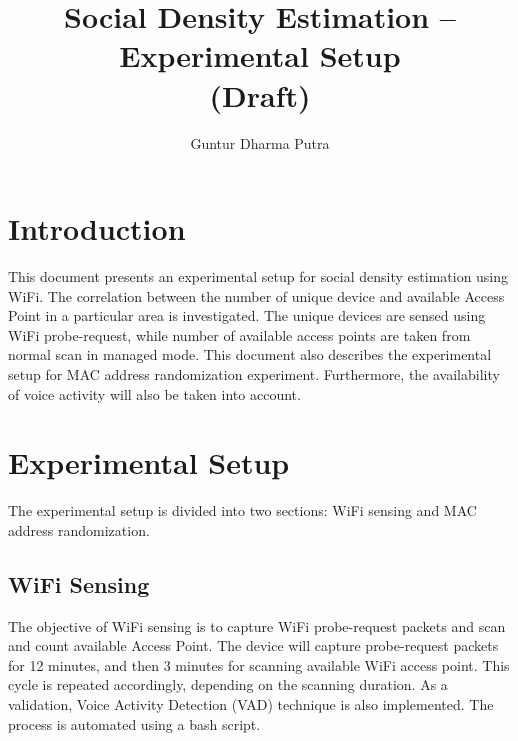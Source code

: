 \documentclass{article}
\begin{document}
\title{Social Density Estimation -- Experimental Setup\\(Draft)}
\author{Guntur Dharma Putra}

\maketitle



\section{Introduction} %
\label{sec:introduction}
This document presents an experimental setup for social density estimation using WiFi. The correlation between the number of unique device and available Access Point in a particular area is investigated. The unique devices are sensed using WiFi probe-request, while number of available access points are taken from normal scan in managed mode. This document also describes the experimental setup for MAC address randomization experiment. Furthermore, the availability of voice activity will also be taken into account.

\section{Experimental Setup} %
\label{sec:experimental_setup}
The experimental setup is divided into two sections: WiFi sensing and MAC address randomization.

\subsection{WiFi Sensing} %
\label{sub:wifi_sensing}
The objective of WiFi sensing is to capture WiFi probe-request packets and scan and count available Access Point. The device will capture probe-request packets for 12 minutes, and then 3 minutes for scanning available WiFi access point. This cycle is repeated accordingly, depending on the scanning duration. As a validation, Voice Activity Detection (VAD) technique is also implemented. The process is automated using a bash script.
\end{document}
